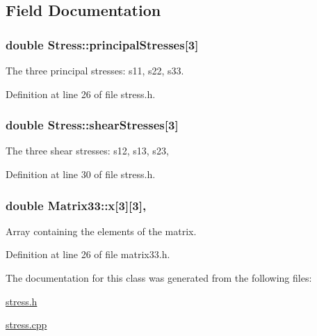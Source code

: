 \subsection{Field Documentation}
\hypertarget{classStress_aea8c3e40aa59a89d7ba79d2c916050a6}{
\subsubsection[{principal\-Stresses}]{\setlength{\rightskip}{0pt plus 5cm}double Stress\-::principal\-Stresses\mbox{[}3\mbox{]}\hspace{0.3cm}{\ttfamily [protected]}}}\label{d1/d1c/classStress_aea8c3e40aa59a89d7ba79d2c916050a6}
The three principal stresses\-: s11, s22, s33. 

Definition at line 26 of file stress.\-h.

\hypertarget{classStress_a77e8705e56c2fb56826a638edf3f78bf}{
\subsubsection[{shear\-Stresses}]{\setlength{\rightskip}{0pt plus 5cm}double Stress\-::shear\-Stresses\mbox{[}3\mbox{]}\hspace{0.3cm}{\ttfamily [protected]}}}\label{d1/d1c/classStress_a77e8705e56c2fb56826a638edf3f78bf}
The three shear stresses\-: s12, s13, s23, 

Definition at line 30 of file stress.\-h.

\hypertarget{classMatrix33_af7f01fa466616eb7c8eda2e4d9f85cdd}{
\subsubsection[{x}]{\setlength{\rightskip}{0pt plus 5cm}double Matrix33\-::x\mbox{[}3\mbox{]}\mbox{[}3\mbox{]}\hspace{0.3cm}{\ttfamily [protected]}, {\ttfamily [inherited]}}}\label{de/d82/classMatrix33_af7f01fa466616eb7c8eda2e4d9f85cdd}


Array containing the elements of the matrix. 



Definition at line 26 of file matrix33.\-h.



The documentation for this class was generated from the following files\-:\begin{DoxyCompactItemize}
\item 
\hyperlink{stress_8h}{stress.\-h}\item 
\hyperlink{stress_8cpp}{stress.\-cpp}\end{DoxyCompactItemize}
